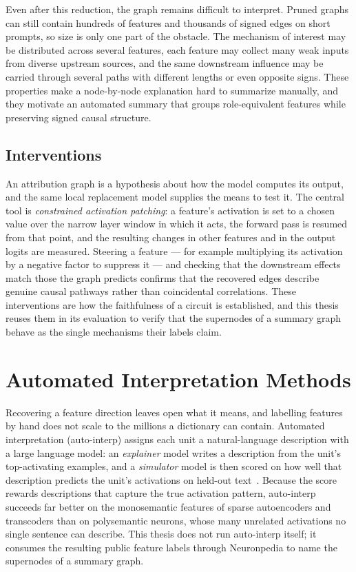 \documentclass[../main.tex]{subfiles}
\begin{document}
Even after this reduction, the graph remains difficult to interpret. Pruned graphs can still contain hundreds of features and thousands of signed edges on short prompts, so size is only one part of the obstacle. The mechanism of interest may be distributed across several features, each feature may collect many weak inputs from diverse upstream sources, and the same downstream influence may be carried through several paths with different lengths or even opposite signs. These properties make a node-by-node explanation hard to summarize manually, and they motivate an automated summary that groups role-equivalent features while preserving signed causal structure.

\subsection{Interventions}
An attribution graph is a hypothesis about how the model computes its output, and the same local replacement model supplies the means to test it. The central tool is \emph{constrained activation patching}: a feature's activation is set to a chosen value over the narrow layer window in which it acts, the forward pass is resumed from that point, and the resulting changes in other features and in the output logits are measured. Steering a feature --- for example multiplying its activation by a negative factor to suppress it --- and checking that the downstream effects match those the graph predicts confirms that the recovered edges describe genuine causal pathways rather than coincidental correlations. These interventions are how the faithfulness of a circuit is established, and this thesis reuses them in its evaluation to verify that the supernodes of a summary graph behave as the single mechanisms their labels claim.
\section{Automated Interpretation Methods}
\label{sec:autointerp}
Recovering a feature direction leaves open what it means, and labelling features by hand does not scale to the millions a dictionary can contain. Automated interpretation (auto-interp) assigns each unit a natural-language description with a large language model: an \emph{explainer} model writes a description from the unit's top-activating examples, and a \emph{simulator} model is then scored on how well that description predicts the unit's activations on held-out text~\cite{bills2023language}. Because the score rewards descriptions that capture the true activation pattern, auto-interp succeeds far better on the monosemantic features of sparse autoencoders and transcoders than on polysemantic neurons, whose many unrelated activations no single sentence can describe. This thesis does not run auto-interp itself; it consumes the resulting public feature labels through Neuronpedia to name the supernodes of a summary graph.
\end{document}
